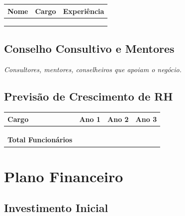 \documentclass[
	12pt,
	openright,
	oneside,
	a4paper,
	chapter=TITLE,
	section=TITLE,
	english,
	brazil
	]{abntex2}
\newcommand{\tcampo}[1]{%
	{#1}%
}
\newcommand{\instrucao}[1]{%
	\vspace{0.3cm}%
	\noindent%
	{%
		\setlength{\fboxsep}{6pt}%
		\colorbox{azul-claro}{%
			\begin{minipage}{\dimexpr\textwidth-2\fboxsep\relax}%
				\setlength{\parindent}{1.25cm}%
				{\color{cinza-instrucao}\small\itshape #1}%
			\end{minipage}%
		}%
	}%
	\vspace{0.3cm}%
}
\begin{document}
\centering
\begin{tabularx}{\textwidth}{X X X}
\toprule
\rowcolor{azul-claro}
\textbf{Nome} & \textbf{Cargo} & \textbf{Experiência} \\
\midrule
\tcampo{} & \tcampo{} & \tcampo{} \\
\tcampo{} & \tcampo{} & \tcampo{} \\
\tcampo{} & \tcampo{} & \tcampo{} \\
\bottomrule
\end{tabularx}

\section{Conselho Consultivo e Mentores}

\instrucao{Consultores, mentores, conselheiros que apoiam o negócio.}

\section{Previsão de Crescimento de RH}

\centering
\begin{tabularx}{\textwidth}{X c c c}
\toprule
\rowcolor{azul-claro}
\textbf{Cargo} & \textbf{Ano 1} & \textbf{Ano 2} & \textbf{Ano 3} \\
\midrule
\tcampo{} & \tcampo{} & \tcampo{} & \tcampo{} \\
\tcampo{} & \tcampo{} & \tcampo{} & \tcampo{} \\
\tcampo{} & \tcampo{} & \tcampo{} & \tcampo{} \\
\textbf{Total Funcionários} & \tcampo{} & \tcampo{} & \tcampo{} \\
\bottomrule
\end{tabularx}

\clearpage

\chapter{Plano Financeiro}

\section{Investimento Inicial}
\end{document}
